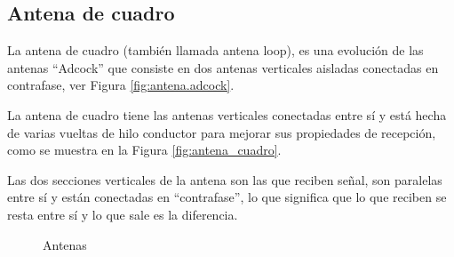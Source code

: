 \subsection{Antena de cuadro}


La antena de cuadro (tambi\'en llamada antena loop), es una evoluci\'on de las antenas ``Adcock'' que consiste en dos antenas verticales aisladas conectadas en contrafase, ver Figura \ref{fig:antena.adcock}.

La antena de cuadro tiene las antenas verticales conectadas entre s\'i y est\'a hecha de varias vueltas de hilo conductor para mejorar sus propiedades de recepci\'on, como se muestra en la Figura \ref{fig:antena_cuadro}.

Las dos secciones verticales de la antena son las que reciben se\~nal, son paralelas entre s\'i y est\'an conectadas en ``contrafase'', lo que significa que lo que reciben se resta entre s\'i y lo que sale es la diferencia.

\begin{figure}[!htb]
  \centering
  \caption{Antenas}
\end{figure}



